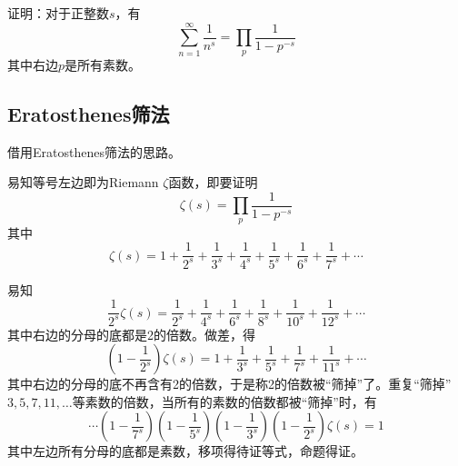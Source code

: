 

证明：对于正整数$s$，有
\[ \sum_{n = 1}^{\infty}\frac1{n^s} = \prod_p\frac1{1 - p^{-s}} \]
其中右边$p$是所有素数。

\subsection{Eratosthenes筛法}

借用Eratosthenes筛法的思路。

易知等号左边即为Riemann $\zeta$函数，即要证明
\[ \zeta(s) = \prod_p\frac1{1 - p^{-s}} \]
其中
\[ \zeta(s) = 1 + \frac1{2^s} + \frac1{3^s} + \frac1{4^s} + \frac1{5^s} + \frac1{6^s} + \frac1{7^s} + \cdots \]

易知
\[ \frac1{2^s}\zeta(s) = \frac1{2^s} + \frac1{4^s} + \frac1{6^s} + \frac1{8^s} + \frac1{10^s} + \frac1{12^s} + \cdots \]
其中右边的分母的底都是2的倍数。做差，得
\[ \left(1 - \frac1{2^s}\right)\zeta(s) = 1 + \frac1{3^s} + \frac1{5^s} + \frac1{7^s} + \frac1{11^s} + \cdots \]
其中右边的分母的底不再含有2的倍数，于是称2的倍数被“筛掉”了。重复“筛掉”$3, 5, 7, 11, \dots$等素数的倍数，当所有的素数的倍数都被“筛掉”时，有
\[ \cdots\left(1 - \frac1{7^s}\right)\left(1 - \frac1{5^s}\right)\left(1 - \frac1{3^s}\right)\left(1 - \frac1{2^s}\right)\zeta(s) = 1 \]
其中左边所有分母的底都是素数，移项得待证等式，命题得证。

